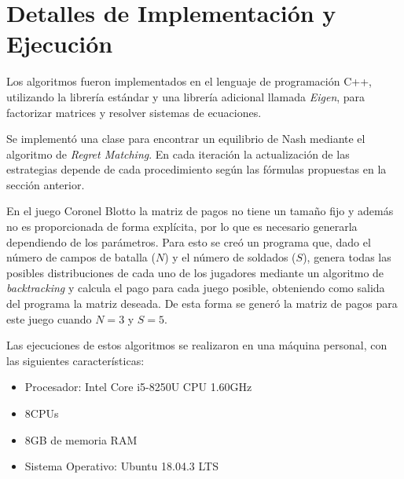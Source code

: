 \section{Detalles de Implementación y Ejecución}

Los algoritmos fueron implementados en el lenguaje de programación C++, utilizando la librería estándar y una librería adicional llamada \textit{Eigen}, para factorizar matrices y resolver sistemas de ecuaciones.

Se implementó una clase para encontrar un equilibrio de Nash mediante el algoritmo de \textit{Regret Matching}. En cada iteración la actualización de las estrategias depende de cada procedimiento según las fórmulas propuestas en la sección anterior.

En el juego Coronel Blotto la matriz de pagos no tiene un tamaño fijo y además no es proporcionada de forma explícita, por lo que es necesario generarla dependiendo de los parámetros. Para esto se creó un programa que, dado el número de campos de batalla ($N$) y el número de soldados ($S$), genera todas las posibles distribuciones de cada uno de los jugadores mediante un algoritmo de \textit{backtracking} y calcula el pago para cada juego posible, obteniendo como salida del programa la matriz deseada. De esta forma se generó la matriz de pagos para este juego cuando $N = 3$ y $S = 5$.

Las ejecuciones de estos algoritmos se realizaron en una máquina personal, con las siguientes características:
\begin{itemize}[noitemsep]
    \item Procesador: Intel\textsuperscript{\textregistered} Core\textsuperscript{\texttrademark} i5-8250U CPU   1.60GHz
    \item 8CPUs
    \item 8GB de memoria RAM
    \item Sistema Operativo: Ubuntu 18.04.3 LTS
\end{itemize}

